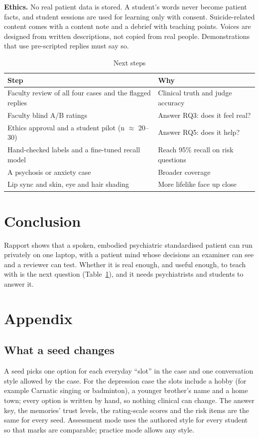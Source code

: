 \documentclass{article}
\begin{document}
\textbf{Ethics.} No real patient data is stored. A student's words never become patient facts, and student sessions are used for learning only with
consent. Suicide-related content comes with a content note and a debrief with teaching points. Voices are designed from written descriptions, not copied
from real people. Demonstrations that use pre-scripted replies must say so.

\begin{table}[t]
\caption{Next steps}
\label{tab:next}
\centering
\scriptsize
\begin{tabular}{ll}
\toprule
Step & Why\\
\midrule
Faculty review of all four cases and the flagged replies & Clinical truth and judge accuracy\\
Faculty blind A/B ratings & Answer RQ3: does it feel real?\\
Ethics approval and a student pilot (n $\approx$ 20--30) & Answer RQ5: does it help?\\
Hand-checked labels and a fine-tuned recall model & Reach 95\% recall on risk questions\\
A psychosis or anxiety case & Broader coverage\\
Lip sync and skin, eye and hair shading & More lifelike face up close\\
\bottomrule
\end{tabular}
\end{table}

\section{Conclusion}
Rapport shows that a spoken, embodied psychiatric standardised patient can run privately on one laptop, with a patient mind whose decisions an examiner
can see and a reviewer can test. Whether it is real enough, and useful enough, to teach with is the next question (Table~\ref{tab:next}), and it needs
psychiatrists and students to answer it.
\section*{Appendix}
\subsection*{What a seed changes}
A seed picks one option for each everyday ``slot'' in the case and one conversation style allowed by the case. For the depression case the slots
include a hobby (for example Carnatic singing or badminton), a younger brother's name and a home town; every option is written by hand, so
nothing clinical can change. The answer key, the memories' trust levels, the rating-scale scores and the risk items are the same for every seed.
Assessment mode uses the authored style for every student so that marks are comparable; practice mode allows any style.
\end{document}
